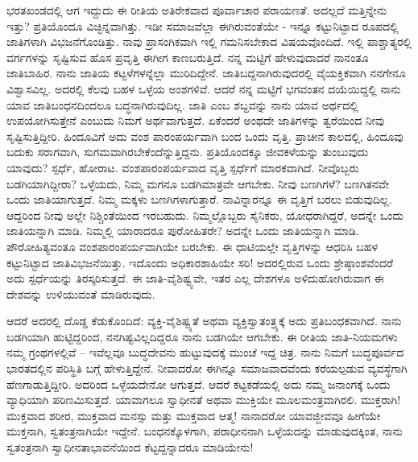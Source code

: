 ಭರತಖಂಡದಲ್ಲಿ ಆಗ ಇದ್ದುದು ಈ ರೀತಿಯ ಅತಿರೇಕವಾದ ಪೂರ್ವಾಚಾರ ಪರಾಯಣತೆ. ಅದಲ್ಲದೆ ಮತ್ತಿನ್ನೇನು ಇತ್ತು? ಪ್ರತಿಯೊಂದೂ ವಿಚ್ಛಿನ್ನವಾಗಿತ್ತು. ಇಡೀ ಸಮಾಜವೆಲ್ಲಾ ಈಗಿರುವಂತೆಯೇ - ಇನ್ನೂ ಕಟ್ಟುನಿಟ್ಟಾದ ರೂಪದಲ್ಲಿ ಜಾತಿಗಳಾಗಿ ವಿಭಜನೆಗೊಂಡಿತ್ತು. ನಾವು ಪ್ರಾಸಂಗಿಕವಾಗಿ ಇಲ್ಲಿ ಗಮನಿಸಬೇಕಾದ ವಿಷಯವೊಂದಿದೆ. ಇಲ್ಲಿ ಪಾಶ್ಚಾತ್ಯರಲ್ಲಿ ವರ್ಗಗಳನ್ನು ಸೃಷ್ಟಿಸುವ ಹೊಸ ಪ್ರವೃತ್ತಿ ಈಗೀಗ ಕಾಣಬರುತ್ತಿದೆ. ನನ್ನ ಮಟ್ಟಿಗೆ ಹೇಳುವುದಾದರೆ ನಾನಂತೂ ಜಾತಿಬಾಹಿರ. ನಾನು ಜಾತಿಯ ಕಟ್ಟಳೆಗಳನ್ನೆಲ್ಲಾ ಮುರಿದಿದ್ದೇನೆ. ಜಾತಿಬದ್ದನಾಗಿರುವುದರಲ್ಲಿ ವೈಯಕ್ತಿಕವಾಗಿ ನನಗೇನೂ ವಿಶ್ವಾಸವಿಲ್ಲ. ಅದರಲ್ಲಿ ಕೆಲವು ಬಹಳ ಒಳ್ಳೆಯ ಅಂಶಗಳಿವೆ. ಆದರೆ ನನ್ನ ಮಟ್ಟಿಗೆ ಭಗವಂತನ ದಯೆಯಿದ್ದಲ್ಲಿ ನಾನು ಯಾವ ಜಾತಿಬಂಧನದಿಂದಲೂ ಬದ್ಧನಾಗಿರುವುದಿಲ್ಲ. ಜಾತಿ ಎಂಬ ಶಬ್ದವನ್ನು ನಾನು ಯಾವ ಅರ್ಥದಲ್ಲಿ ಉಪಯೋಗಿಸುತ್ತೇನೆ ಎಂಬುದು ನಿಮಗೆ ಅರ್ಥವಾಗುತ್ತದೆ. ಏಕೆಂದರೆ ಅಂಥದೇ ಜಾತಿಗಳನ್ನು ತ್ವರೆಯಿಂದ ನೀವು ಸೃಷ್ಟಿಸುತ್ತಿದ್ದೀರಿ. ಹಿಂದೂವಿಗೆ ಅದು ವಂಶ ಪಾರಂಪರ್ಯವಾಗಿ ಬಂದ ಒಂದು ವೃತ್ತಿ. ಪ್ರಾಚೀನ ಕಾಲದಲ್ಲಿ, ಹಿಂದೂವು ಬದುಕು ಸರಾಗವಾಗಿ, ಸುಗಮವಾಗಿರಬೇಕೆಂದೆನ್ನುತ್ತಿದ್ದನು. ಪ್ರತಿಯೊಂದಕ್ಕೂ ಜೀವಕಳೆಯನ್ನು ತುಂಬುವುದು ಯಾವುದು? ಸ್ಪರ್ಧೆ, ಹೋರಾಟ. ವಂಶಪಾರಂಪರ್ಯವಾದ ವೃತ್ತಿ ಸ್ಪರ್ಧೆಗೆ ಮಾರಕವಾಗಿದೆ. ನೀವೊಬ್ಬರು ಬಡಗಿಯಾಗಿದ್ದೀರಾ? ಒಳ್ಳೆಯದು, ನಿಮ್ಮ ಮಗನೂ ಬಡಗಿಮಾತ್ರವೇ ಆಗಬೇಕು. ನೀವು ಬಣಗಿಗಳೆ? ಬಣಗಿತನವೇ ಒಂದು ಜಾತಿಯಾಗುತ್ತದೆ. ನಿಮ್ಮ ಮಕ್ಕಳು ಬಣಗಿಗಳಾಗುತ್ತಾರೆ. ನಾವಿನ್ನಾರನ್ನೂ ಈ ವೃತ್ತಿಗೆ ಬರಲು ಬಿಡುವುದಿಲ್ಲ. ಆದ್ದರಿಂದ ನೀವು ಅಲ್ಲೇ ನಿಶ್ಚಿಂತೆಯಿಂದ ಇರಬಹುದು. ನಿಮ್ಮಲ್ಲೊಬ್ಬರು ಸೈನಿಕರು, ಯೋಧರಾಗಿದ್ದರೆ, ಅದನ್ನೇ ಒಂದು ಜಾತಿಯನ್ನಾಗಿ ಮಾಡಿ. ನಿಮ್ಮಲ್ಲಿ ಯಾರಾದರೂ ಪುರೋಹಿತರೇ? ಅದನ್ನೇ ಒಂದು ಜಾತಿಯನ್ನಾಗಿ ಮಾಡಿ. ಪೌರೋಹಿತ್ಯವಂತೂ ವಂಶಪಾರಂಪರ್ಯವಾಗಿಯೇ ಬರಬೇಕು. ಈ ಧಾಟಿಯಲ್ಲೇ ವೃತ್ತಿಗಳನ್ನು ಆಧರಿಸಿ ಬಹಳ ಕಟ್ಟುನಿಟ್ಟಾದ ಜಾತಿವಿಭಜನೆಯಿತ್ತು. ಇದೊಂದು ಅಧಿಕಾರಶಾಹಿಯೇ ಸರಿ! ಅದರಲ್ಲಿರುವ ಒಂದು ಶ್ರೇಷ್ಠಾಂಶವೆಂದರೆ ಅದು ಸ್ಪರ್ಧೆಯನ್ನು ತಿರಸ್ಕರಿಸುತ್ತದೆ. ಈ ಜಾತಿ-ವೈಶಿಷ್ಟ್ಯವೇ, ಇತರ ಎಲ್ಲ ದೇಶಗಳೂ ಅಳಿದುಹೋಗಿರುವಾಗ ಈ ದೇಶವನ್ನು ಉಳಿಯುವಂತೆ ಮಾಡಿರುವುದು.

ಆದರೆ ಅದರಲ್ಲಿ ದೊಡ್ಡ ಕೆಡುಕೊಂದಿದೆ: ವ್ಯಕ್ತಿ-ವೈಶಿಷ್ಟ್ಯತೆ ಅಥವಾ ವ್ಯಕ್ತಿಸ್ವಾತಂತ್ರ್ಯಕ್ಕೆ ಅದು ಪ್ರತಿಬಂಧಕವಾಗಿದೆ. ನಾನು ಬಡಗಿಯಾಗಿ ಹುಟ್ಟಿದ್ದರಿಂದ, ನನಗಿಷ್ಟವಿಲ್ಲದಿದ್ದರೂ ನಾನು ಬಡಗಿಯೇ ಆಗಬೇಕು. ಈ ರೀತಿಯ ಜಾತಿ-ನಿಯಮಗಳು ನಮ್ಮ ಗ್ರಂಥಗಳಲ್ಲಿವೆ – ಇವೆಲ್ಲವೂ ಬುದ್ಧದೇವನು ಹುಟ್ಟುವುದಕ್ಕೆ ಮುಂಚೆ ಇದ್ದ ಚಿತ್ರ. ನಾನು ನಿಮಗೆ ಬುದ್ಧಪೂರ್ವದ ಭಾರತದಲ್ಲಿನ ಪರಿಸ್ಥಿತಿ ಬಗ್ಗೆ ಹೇಳುತ್ತಿದ್ದೇನೆ. ನೀವಾದರೋ ಈಗಿನ್ನೂ ಸಮಾಜವಾದವೆಂದು ಕರೆಯಲ್ಪಡುವ ವ್ಯವಸ್ಥೆಗಾಗಿ ಹೆಣಗಾಡುತ್ತಿದ್ದೀರಿ. ಅದರಿಂದ ಒಳ್ಳೆಯದೇನೋ ಆಗುತ್ತದೆ. ಆದರೆ ಕಟ್ಟಕಡೆಯಲ್ಲಿ ಅದು ನಮ್ಮ ಜನಾಂಗಕ್ಕೆ ಒಂದು ವ್ಯಾಧಿಯಾಗಿ ಪರಿಣಮಿಸುತ್ತದೆ. ಯಾವಾಗಲೂ ಸ್ವಾಧೀನತೆ ಅಥವಾ ಮುಕ್ತಿಯೇ ಮೂಲಮಂತ್ರವಾಗಿರಲಿ. ಮುಕ್ತರಾಗಿ! ಮುಕ್ತವಾದ ಶರೀರ, ಮುಕ್ತವಾದ ಮನಸ್ಸು ಮತ್ತು ಮುಕ್ತವಾದ ಆತ್ಮ! ನಾನಾದರೋ ಯಾವಜ್ಜೀವವೂ ಹೀಗೆಯೇ ಮುಕ್ತನಾಗಿ, ಸ್ವತಂತ್ರನಾಗಿಯೇ ಇದ್ದೇನೆ. ಬಂಧನಕ್ಕೊಳಗಾಗಿ, ಪರಾಧೀನನಾಗಿ ಒಳ್ಳೆಯದನ್ನು ಮಾಡುವುದಕ್ಕಿಂತ, ನಾನು ಸ್ವತಂತ್ರನಾಗಿ ಸ್ವಾಧೀನತಾಭಾವನೆಯಿಂದ ಕೆಟ್ಟದ್ದನ್ನಾದರೂ ಮಾಡಿಯೇನು!

